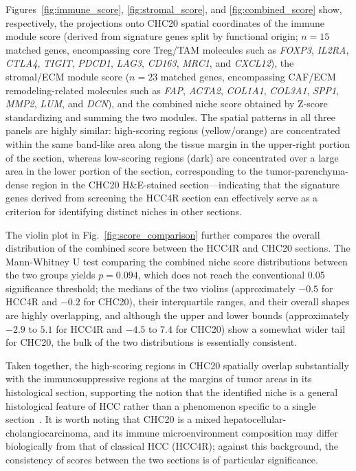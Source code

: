 \documentclass[12pt, a4paper]{article}
\begin{document}
Figures~\ref{fig:immune_score}, \ref{fig:stromal_score}, and \ref{fig:combined_score} show, respectively, the projections onto CHC20 spatial coordinates of the immune module score (derived from signature genes split by functional origin; $n = 15$ matched genes, encompassing core Treg/TAM molecules such as \textit{FOXP3}, \textit{IL2RA}, \textit{CTLA4}, \textit{TIGIT}, \textit{PDCD1}, \textit{LAG3}, \textit{CD163}, \textit{MRC1}, and \textit{CXCL12}), the stromal/ECM module score ($n = 23$ matched genes, encompassing CAF/ECM remodeling-related molecules such as \textit{FAP}, \textit{ACTA2}, \textit{COL1A1}, \textit{COL3A1}, \textit{SPP1}, \textit{MMP2}, \textit{LUM}, and \textit{DCN}), and the combined niche score obtained by Z-score standardizing and summing the two modules. The spatial patterns in all three panels are highly similar: high-scoring regions (yellow/orange) are concentrated within the same band-like area along the tissue margin in the upper-right portion of the section, whereas low-scoring regions (dark) are concentrated over a large area in the lower portion of the section, corresponding to the tumor-parenchyma-dense region in the CHC20 H\&E-stained section—indicating that the signature genes derived from screening the HCC4R section can effectively serve as a criterion for identifying distinct niches in other sections.

The violin plot in Fig.~\ref{fig:score_comparison} further compares the overall distribution of the combined score between the HCC4R and CHC20 sections. The Mann-Whitney U test comparing the combined niche score distributions between the two groups yields $p = 0.094$, which does not reach the conventional 0.05 significance threshold; the medians of the two violins (approximately $-0.5$ for HCC4R and $-0.2$ for CHC20), their interquartile ranges, and their overall shapes are highly overlapping, and although the upper and lower bounds (approximately $-2.9$ to $5.1$ for HCC4R and $-4.5$ to $7.4$ for CHC20) show a somewhat wider tail for CHC20, the bulk of the two distributions is essentially consistent.

Taken together, the high-scoring regions in CHC20 spatially overlap substantially with the immunosuppressive regions at the margins of tumor areas in its histological section, supporting the notion that the identified niche is a general histological feature of HCC rather than a phenomenon specific to a single section~\citep{llovet2021hepatocellular}. It is worth noting that CHC20 is a mixed hepatocellular-cholangiocarcinoma, and its immune microenvironment composition may differ biologically from that of classical HCC (HCC4R); against this background, the consistency of scores between the two sections is of particular significance.
\end{document}
